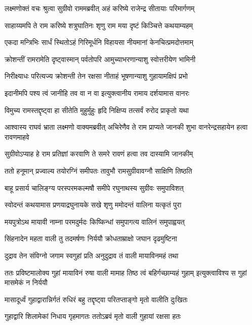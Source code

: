 \twolineshloka
{लक्ष्मणोक्तं वचः श्रुत्वा सुग्रीवो राममब्रवीत्}
{अहं करिष्ये राजेन्द्र सीतायाः परिमार्गणम्} %

\twolineshloka
{साहाय्यमपि ते राम करिष्ये शत्रुघातिनः}
{शृणु राम मया दृष्टं किञ्चित्ते कथयाम्यहम्} %

\twolineshloka
{एकदा मन्त्रिभिः सार्धं स्थितोऽहं गिरिमूर्धनि}
{विहायसा नीयमानां केनचित्प्रमदोत्तमाम्} %

\twolineshloka
{क्रोशन्तीं रामरामेति दृष्ट्वास्मान् पर्वतोपरि}
{आमुच्याभरणान्याशु स्वोत्तरीयेण भामिनी} %

\twolineshloka
{निरीक्ष्याधः परित्यज्य क्रोशन्ती तेन रक्षसा}
{नीताहं भूषणान्याशु गुहायामक्षिपं प्रभो} %

\twolineshloka
{इदानीमपि पश्य त्वं जानीहि तव वा न वा}
{इत्युक्त्वानीय रामाय दर्शयामास वानरः} %

\twolineshloka
{विमुच्य रामस्तद्दृष्ट्वा हा सीतेति मुहुर्मुहुः}
{हृदि निक्षिप्य तत्सर्वं रुरोद प्राकृतो यथा} %

\threelineshloka
{आश्वास्य राघवं भ्राता लक्ष्मणो वाक्यमब्रवीत्}
{अचिरेणैव ते राम प्राप्यते जानकी शुभा}
{वानरेन्द्रसहायेन हत्वा रावणमाहवे} %

\twolineshloka
{सुग्रीवोऽप्याह हे राम प्रतिज्ञां करवाणि ते}
{समरे रावणं हत्वा तव दास्यामि जानकीम्} %

\twolineshloka
{ततो हनूमान् प्रज्वाल्य तयोरग्निं समीपतः}
{तावुभौ रामसुग्रीवावग्नौ साक्षिणि तिष्ठति} %

\twolineshloka
{बाहू प्रसार्य चालिङ्ग्य परस्परमकल्मषौ}
{समीपे रघुनाथस्य सुग्रीवः समुपाविशत्} %

\twolineshloka
{स्वोदन्तं कथयामास प्रणयाद्रघुनायके}
{सखे शृणु ममोदन्तं वालिना यत्कृतं पुरा} %

\twolineshloka
{मयपुत्रोऽथ मायावी नाम्ना परमदुर्मदः}
{किष्किन्धां समुपागत्य वालिनं समुपाह्वयत्} %

\twolineshloka
{सिंहनादेन महता वाली तु तदमर्षणः}
{निर्ययौ क्रोधताम्राक्षो जघान दृढमुष्टिना} %

\twolineshloka
{दुद्राव तेन संविग्नो जगाम स्वगुहां प्रति}
{अनुदुद्राव तं वाली मायाविनमहं तथा} %

\threelineshloka
{ततः प्रविष्टमालोक्य गुहां मायाविनं रुषा}
{वाली मामाह तिष्ठ त्वं बहिर्गच्छाम्यहं गुहाम्}
{इत्युक्त्वाविश्य स गुहां मासमेकं न निर्ययौ} %

\twolineshloka
{मासादूर्ध्वं गुहाद्वारान्निर्गतं रुधिरं बहु}
{तद्दृष्ट्वा परितप्ताङ्गो मृतो वालीति दुःखितः} %

\twolineshloka
{गुहाद्वारि शिलामेकां निधाय गृहमागतः}
{ततोऽब्रवं मृतो वाली गुहायां रक्षसा हतः} %

